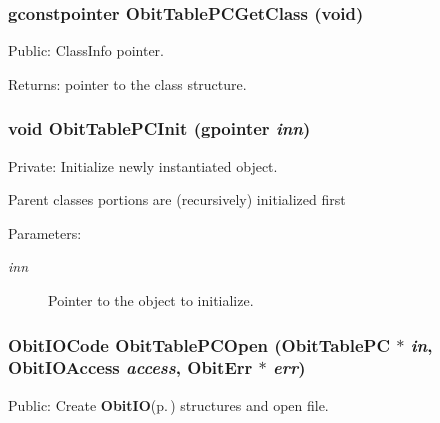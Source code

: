 \subsubsection{\setlength{\rightskip}{0pt plus 5cm}gconstpointer Obit\-Table\-PCGet\-Class (void)}\label{ObitTablePC_8c_a17}


Public: Class\-Info pointer. 

\begin{Desc}
\item[Returns:]pointer to the class structure. \end{Desc}
\subsubsection{\setlength{\rightskip}{0pt plus 5cm}void Obit\-Table\-PCInit (gpointer {\em inn})}\label{ObitTablePC_8c_a8}


Private: Initialize newly instantiated object. 

Parent classes portions are (recursively) initialized first \begin{Desc}
\item[Parameters:]
\begin{description}
\item[{\em inn}]Pointer to the object to initialize. \end{description}
\end{Desc}
\subsubsection{\setlength{\rightskip}{0pt plus 5cm}Obit\-IOCode Obit\-Table\-PCOpen ({\bf Obit\-Table\-PC} $\ast$ {\em in}, Obit\-IOAccess {\em access}, {\bf Obit\-Err} $\ast$ {\em err})}\label{ObitTablePC_8c_a21}


Public: Create {\bf Obit\-IO}{\rm (p.\,\pageref{structObitIO})} structures and open file. 

